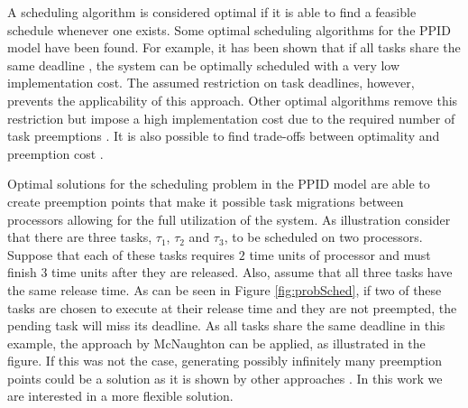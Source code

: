 \documentclass[twocolumn, compsocconf]{IEEEtran}
\newlength{\execWidth}
\newcounter{proc}
\begin{document}
A scheduling algorithm is considered optimal if it is able to find a feasible
schedule whenever one exists. Some optimal scheduling algorithms for the PPID
model have been found. For example, it has been shown that if all tasks share
the same deadline \cite{McNaughton59}, the system can be optimally scheduled
with a very low implementation cost. The assumed restriction on task deadlines,
however, prevents the applicability of this approach. Other optimal algorithms
remove this restriction but impose a high implementation cost due to the
required number of task preemptions \cite{Baruah96, Cho06, Levin2010}. It is
also possible to find trade-offs between optimality and preemption cost
\cite{Andersson08, Massa10, Andersson08b, Bletsas09}.

Optimal solutions for the scheduling problem in the PPID model are able to
create preemption points that make it possible task migrations between
processors allowing for the full utilization of the system. As illustration
consider that there are three tasks, $\tau_1$, $\tau_2$ and $\tau_3$, to be
scheduled on two processors. Suppose that each of these tasks requires $2$ time
units of processor and must finish $3$ time units after they are released.
Also, assume that all three tasks have the same release time. As can be seen in
Figure \ref{fig:probSched}, if two of these tasks are chosen to execute at their
release time and they are not preempted, the pending task will miss its
deadline. As all tasks share the same deadline in this example, the approach by
McNaughton \cite{McNaughton59} can be applied, as illustrated in the figure. If
this was not the case, generating possibly infinitely many preemption points
could be a solution as it is shown by other approaches \cite{Baruah96, Cho06,
  Levin2010}. In this work we are interested in a more flexible solution.

\setlength{\execWidth}{0.37\psyunit}
\end{document}
